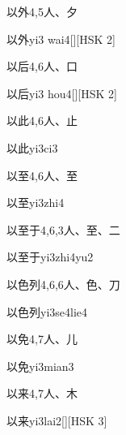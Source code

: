 \begin{entry}{以外}{4,5}{⼈、⼣}
  \begin{phonetics}{以外}{yi3 wai4}[][HSK 2]
  \end{phonetics}
\end{entry}

\begin{entry}{以后}{4,6}{⼈、⼝}
  \begin{phonetics}{以后}{yi3 hou4}[][HSK 2]
  \end{phonetics}
\end{entry}

\begin{entry}{以此}{4,6}{⼈、⽌}
  \begin{phonetics}{以此}{yi3ci3}
  \end{phonetics}
\end{entry}

\begin{entry}{以至}{4,6}{⼈、⾄}
  \begin{phonetics}{以至}{yi3zhi4}
  \end{phonetics}
\end{entry}

\begin{entry}{以至于}{4,6,3}{⼈、⾄、⼆}
  \begin{phonetics}{以至于}{yi3zhi4yu2}
  \end{phonetics}
\end{entry}

\begin{entry}{以色列}{4,6,6}{⼈、⾊、⼑}
  \begin{phonetics}{以色列}{yi3se4lie4}
  \end{phonetics}
\end{entry}

\begin{entry}{以免}{4,7}{⼈、⼉}
  \begin{phonetics}{以免}{yi3mian3}
  \end{phonetics}
\end{entry}

\begin{entry}{以来}{4,7}{⼈、⽊}
  \begin{phonetics}{以来}{yi3lai2}[][HSK 3]
  \end{phonetics}
\end{entry}

